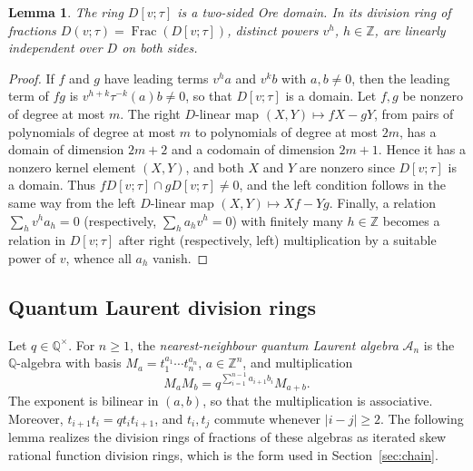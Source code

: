 \documentclass[11pt,a4paper]{amsart}
\newtheorem{lemma}[theorem]{Lemma}
\numberwithin{equation}{section}
\newcommand{\Frac}{\operatorname{Frac}}
\newcommand{\Q}{\mathbb{Q}}
\begin{document}
\begin{lemma}\label{lem:skew}
The ring $D[v;\tau]$ is a two-sided Ore domain. In its division ring of fractions $D(v;\tau)=\Frac(D[v;\tau])$, distinct powers $v^h$, $h\in\mathbb Z$, are linearly independent over $D$ on both sides.
\end{lemma}

\begin{proof}
If $f$ and $g$ have leading terms $v^ha$ and $v^kb$ with $a,b\ne0$, then the leading term of $fg$ is $v^{h+k}\tau^{-k}(a)b\ne0$, so that $D[v;\tau]$ is a domain. Let $f,g$ be nonzero of degree at most $m$. The right $D$-linear map $(X,Y)\mapsto fX-gY$, from pairs of polynomials of degree at most $m$ to polynomials of degree at most $2m$, has a domain of dimension $2m+2$ and a codomain of dimension $2m+1$. Hence it has a nonzero kernel element $(X,Y)$, and both $X$ and $Y$ are nonzero since $D[v;\tau]$ is a domain. Thus $fD[v;\tau]\cap gD[v;\tau]\ne0$, and the left condition follows in the same way from the left $D$-linear map $(X,Y)\mapsto Xf-Yg$. Finally, a relation $\sum_hv^ha_h=0$ (respectively, $\sum_ha_hv^h=0$) with finitely many $h\in\mathbb Z$ becomes a relation in $D[v;\tau]$ after right (respectively, left) multiplication by a suitable power of $v$, whence all $a_h$ vanish.
\end{proof}

\subsection{Quantum Laurent division rings}\label{subsec:qtorus}

Let $q\in\Q^\times$. For $n\ge1$, the \emph{nearest-neighbour quantum Laurent algebra} $\mathcal A_n$ is the $\Q$-algebra with basis $M_a=t_1^{a_1}\cdots t_n^{a_n}$, $a\in\mathbb Z^n$, and multiplication
\begin{equation}\label{eq:qtorus}
M_aM_b=q^{\sum_{i=1}^{n-1}a_{i+1}b_i}M_{a+b}.
\end{equation}
The exponent is bilinear in $(a,b)$, so that the multiplication is associative. Moreover, $t_{i+1}t_i=qt_it_{i+1}$, and $t_i,t_j$ commute whenever $|i-j|\ge2$. The following lemma realizes the division rings of fractions of these algebras as iterated skew rational function division rings, which is the form used in Section~\ref{sec:chain}.
\end{document}
